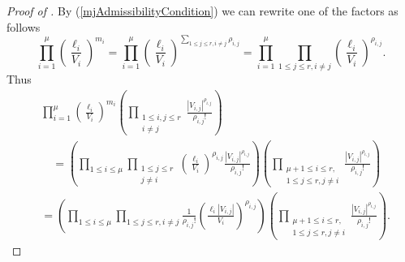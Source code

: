 \documentclass[oneside, 12pt]{amsart}
\theoremstyle{definition}
\begin{document}
\begin{proof}[Proof of ]
		By (\ref{mjAdmissibilityCondition}) we can rewrite one of the factors as follows $$\prod_{i=1}^{\mu} \left(\frac{\ell_i}{V_i}\right)^{m_i} = \prod_{i=1}^{\mu} \left(\frac{\ell_i}{V_i}\right)^{\sum_{1\leq j \leq r, i \neq j} \rho_{i,j}}=\prod_{i=1}^{\mu} \prod_{1\leq j \leq r, i\neq j} \left(\frac{\ell_i}{V_i}\right)^{\rho_{i,j}}.$$ Thus
		\begin{align*}
			&\prod_{i=1}^{\mu} \left(\frac{\ell_i}{V_i}\right)^{m_i}
			\left(\prod_{\substack{1\leq i,j\leq r\\i\neq j}}
			\frac{|V_{i,j}|^{\rho_{i,j}}}{\rho_{i,j}!}\right)\\
			&\quad=\left(\prod_{1\leq i \leq \mu}
			\prod_{\substack{1\leq j \leq r\\j\neq i}}
			\left(\frac{\ell_i}{V_i}\right)^{\rho_{i,j}}
			\frac{|V_{i,j}|^{\rho_{i,j}}}{\rho_{i,j}!}\right)
			\left(\prod_{\substack{\mu+1\leq i \leq r,\\ 1\leq j \leq r, j\neq i}}\frac{|V_{i,j}|^{\rho_{i,j}}}{\rho_{i,j}!}\right) \\
			&= \left(\prod_{1\leq i \leq \mu} \prod_{1\leq j \leq r, i \neq j} \frac{1}{\rho_{i,j}!}\left(\frac{\ell_i|V_{i,j}|}{V_i}\right)^{\rho_{i,j}} \right)\left(\prod_{\substack{\mu+1\leq i \leq r,\\ 1\leq j \leq r, j\neq i}}\frac{|V_{i,j}|^{\rho_{i,j}}}{\rho_{i,j}!}\right).
		\end{align*}
		

\end{proof}
\end{document}
